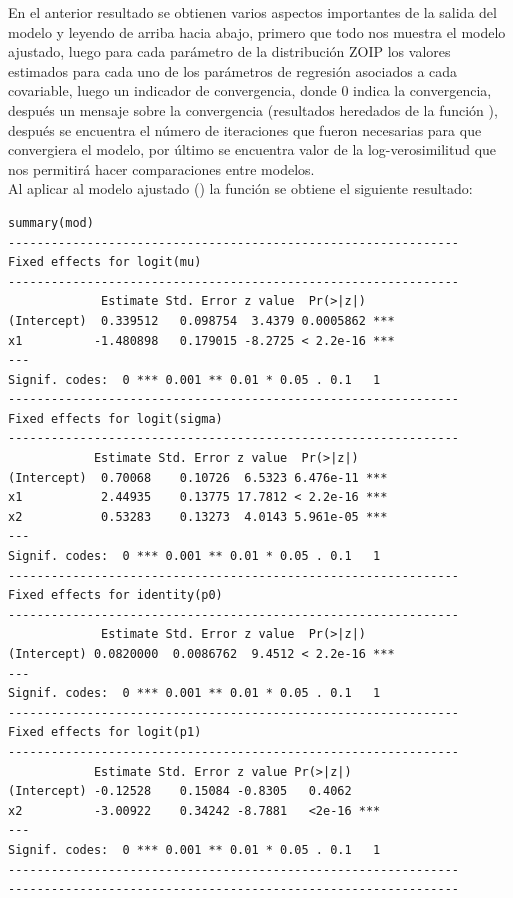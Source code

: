 En el anterior resultado se obtienen varios aspectos importantes de la salida del modelo y leyendo de arriba hacia abajo, primero que todo nos muestra el modelo ajustado, luego para cada par\'{a}metro de la distribuci\'{o}n ZOIP los valores estimados para cada uno de los par\'{a}metros de regresi\'{o}n asociados a cada covariable, luego un indicador de convergencia, donde 0 indica la convergencia, despu\'{e}s un mensaje sobre la convergencia (resultados heredados de la funci\'{o}n ), despu\'{e}s se encuentra el n\'{u}mero de iteraciones que fueron necesarias para que convergiera el modelo, por \'{u}ltimo se encuentra valor de la log-verosimilitud que nos permitir\'{a} hacer comparaciones entre modelos.\\ 

 Al aplicar al modelo ajustado () la funci\'{o}n  se obtiene el siguiente resultado:

\begin{verbatim}
summary(mod)
---------------------------------------------------------------
Fixed effects for logit(mu) 
---------------------------------------------------------------
             Estimate Std. Error z value  Pr(>|z|)    
(Intercept)  0.339512   0.098754  3.4379 0.0005862 ***
x1          -1.480898   0.179015 -8.2725 < 2.2e-16 ***
---
Signif. codes:  0 *** 0.001 ** 0.01 * 0.05 . 0.1   1
---------------------------------------------------------------
Fixed effects for logit(sigma) 
---------------------------------------------------------------
            Estimate Std. Error z value  Pr(>|z|)    
(Intercept)  0.70068    0.10726  6.5323 6.476e-11 ***
x1           2.44935    0.13775 17.7812 < 2.2e-16 ***
x2           0.53283    0.13273  4.0143 5.961e-05 ***
---
Signif. codes:  0 *** 0.001 ** 0.01 * 0.05 . 0.1   1
---------------------------------------------------------------
Fixed effects for identity(p0) 
---------------------------------------------------------------
             Estimate Std. Error z value  Pr(>|z|)    
(Intercept) 0.0820000  0.0086762  9.4512 < 2.2e-16 ***
---
Signif. codes:  0 *** 0.001 ** 0.01 * 0.05 . 0.1   1
---------------------------------------------------------------
Fixed effects for logit(p1) 
---------------------------------------------------------------
            Estimate Std. Error z value Pr(>|z|)    
(Intercept) -0.12528    0.15084 -0.8305   0.4062    
x2          -3.00922    0.34242 -8.7881   <2e-16 ***
---
Signif. codes:  0 *** 0.001 ** 0.01 * 0.05 . 0.1   1
---------------------------------------------------------------
---------------------------------------------------------------
\end{verbatim}

